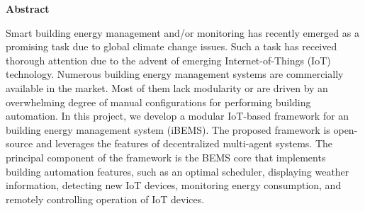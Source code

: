 
\begin{center}\textbf{Abstract}\end{center}


Smart building energy management and/or monitoring has recently emerged as a
promising task due to global climate change issues. Such a task has received thorough attention
due to the advent of emerging Internet-of-Things (IoT) technology. Numerous building energy
management systems are commercially available in the market. Most of them lack modularity
or are driven by an overwhelming degree of manual configurations for performing building
automation. In this project, we develop a modular IoT-based framework for an  building
energy management system (iBEMS). The proposed framework is open-source and leverages the
features of decentralized multi-agent systems. The principal component of the framework is the
BEMS core that implements building automation features, such as an optimal scheduler,
displaying weather information, detecting new IoT devices, monitoring energy consumption,
and remotely controlling operation of IoT devices.
\cleardoublepage



